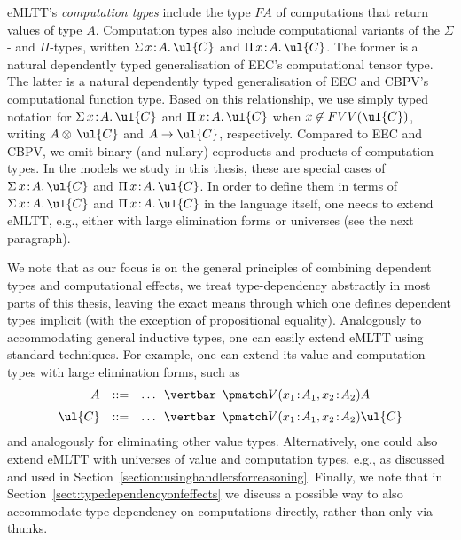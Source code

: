 eMLTT's \emph{computation types} include the type $FA$ of computations that return values of type $A$. Computation types also include computational variants of the $\Sigma$- and $\Pi$-types, written $\Sigma\, x \!:\! A .\, \ul{C}$ and $\Pi\, x \!:\! A .\, \ul{C}$. The former is a natural dependently typed generalisation of EEC's computational tensor type. The latter is a natural dependently typed generalisation of EEC and CBPV's computational function type. Based on this relationship, we use simply typed notation for $\Sigma\, x \!:\! A .\, \ul{C}$ and $\Pi\, x \!:\! A .\, \ul{C}$ when $x \not\in FVV(\ul{C})$, writing  $A \otimes\, \ul{C}$ and $A \to \ul{C}$, respectively. 
%
%
Compared to EEC and CBPV, we omit binary (and nullary) coproducts and products of 
computation types. In the models we study in this thesis, these are special cases 
of $\Sigma\, x \!:\! A .\, \ul{C}$ and $\Pi\, x \!:\! A .\, \ul{C}$. In order to define them 
in terms of $\Sigma\, x \!:\! A .\, \ul{C}$ and $\Pi\, x \!:\! A .\, \ul{C}$ in the language itself, 
one needs to extend eMLTT, e.g., either with large elimination forms or universes (see the next paragraph).

We note that as our focus is on the general principles of combining  
dependent types and computational effects, we treat type-dependency 
abstractly in most parts of this thesis, leaving the exact means through 
which one defines dependent types implicit (with the exception of  
propositional equality). Analogously to accommodating general 
inductive types, one can easily extend eMLTT using standard techniques. For example,  
one can extend its value and computation types 
with large elimination forms, such as 
\[
\begin{array}{r c l}
A & ::= & \ldots \,\,\,\vertbar\,\,\, \pmatch V {(x_1 \!:\! A_1, x_2 \!:\! A_2)} {} A
\\[2mm]
\ul{C} & ::= & \ldots \,\,\,\vertbar\,\,\, \pmatch V {(x_1 \!:\! A_1, x_2 \!:\! A_2)} {} \ul{C}
\end{array}
\]
and analogously for eliminating other value types. 
Alternatively, one could also extend eMLTT with universes 
of value and computation types, e.g., as discussed and used in Section~\ref{section:usinghandlersforreasoning}.
Finally, we note that in Section~\ref{sect:typedependencyonfeffects} we 
discuss a possible way to also accommodate type-dependency 
on computations directly, rather than only via thunks.



